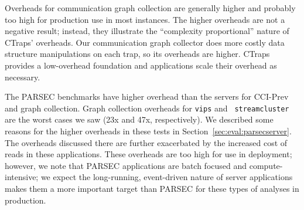 \documentclass[pageno,nohyperref]{jpaper}
\newcommand{\addtodo}[1]{\textcolor{red}{[To do: #1]}}
\newcommand{\ctraps}{CTraps\xspace}
\newcommand{\ctrapsmm}{CTraps-NRR\xspace}
\begin{document}
Overheads for communication graph collection are generally higher and probably
too high for production use in most instances.  The higher overheads are not a
negative result; instead, they illustrate the ``complexity proportional''
nature of \ctraps' overheads.  Our communication graph collector
does more costly data structure manipulations on each trap, so
its overheads are higher.  \ctraps provides a low-overhead foundation and
applications scale their overhead as necessary. 



The PARSEC benchmarks have higher overhead than the servers for CCI-Prev and
graph collection.  Graph collection overheads for {\tt vips} and {\tt
streamcluster} are the worst cases we saw (23x and 47x, respectively).  We
described some reasons for the higher overheads in these tests in
Section~\ref{sec:eval:parsecserver}.  The overheads discussed there are further
exacerbated by the increased cost of reads in these applications.  These
overheads are too high for use in deployment;  however, we note that PARSEC
applications are batch focused and compute-intensive; we expect the
long-running, event-driven nature of server applications makes them a more
important target than PARSEC for these types of analyses in production.  




\end{document}

